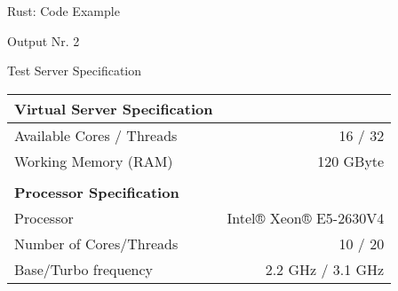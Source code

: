 \begin{frame}[c]{Rust: Code Example}
    \begin{codeboxed}{Output Nr. 2}
        \footnotesize
        
    \end{codeboxed}
\end{frame}


\begin{frame}[c]{Test Server Specification}
    \normalsize
    \begin{tabular}{@{}lr@{}}
        \textbf{Virtual Server Specification} & \\
        \hline
        Available Cores / Threads & 16 / 32 \\
        Working Memory (RAM) & 120 GByte \\ \\
        \textbf{Processor Specification} & \\
        \hline
        Processor & Intel® Xeon® E5-2630V4 \\
        Number of Cores/Threads & 10 / 20 \\
        Base/Turbo frequency & 2.2 GHz / 3.1 GHz \\
    \end{tabular}
\end{frame}

\backupend
